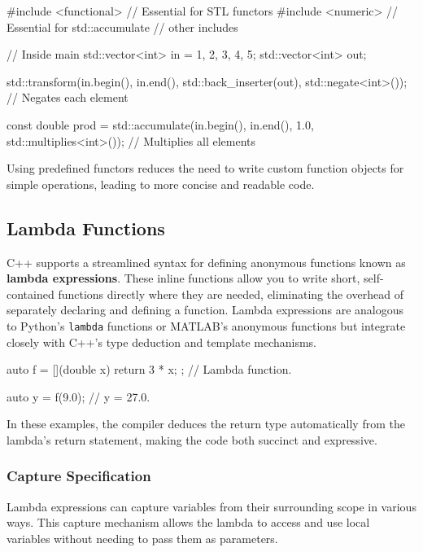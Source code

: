 \begin{codeblock}[language=C++]
#include <functional> // Essential for STL functors
#include <numeric>    // Essential for std::accumulate
// other includes 

// Inside main
std::vector<int> in = {1, 2, 3, 4, 5};
std::vector<int> out;

std::transform(in.begin(), in.end(), std::back_inserter(out), std::negate<int>()); // Negates each element

const double prod = std::accumulate(in.begin(), in.end(), 1.0, std::multiplies<int>()); // Multiplies all elements
\end{codeblock}

Using predefined functors reduces the need to write custom function objects for simple operations, leading to more concise and readable code.

\subsection{Lambda Functions}

C++ supports a streamlined syntax for defining anonymous functions known as \textbf{lambda expressions}. These inline functions allow you to write short, self-contained functions directly where they are needed, eliminating the overhead of separately declaring and defining a function. Lambda expressions are analogous to Python's \texttt{lambda} functions or MATLAB's anonymous functions but integrate closely with C++'s type deduction and template mechanisms.

\begin{codeblock}[language=C++]
auto f = [](double x) { return 3 * x; }; // Lambda function.

auto y = f(9.0); // y = 27.0.
\end{codeblock}

In these examples, the compiler deduces the return type automatically from the lambda's return statement, making the code both succinct and expressive.

\subsubsection{Capture Specification}

Lambda expressions can capture variables from their surrounding scope in various ways. This capture mechanism allows the lambda to access and use local variables without needing to pass them as parameters.

